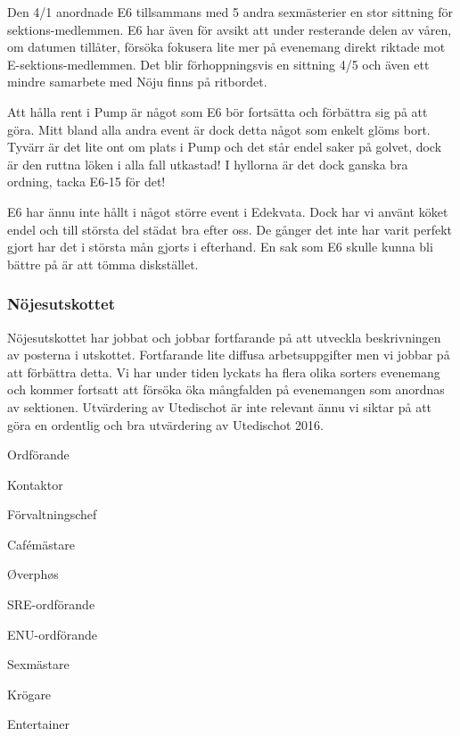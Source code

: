 \documentclass[../_main/handlingar.tex]{subfiles}
\begin{document}
Den 4/1 anordnade E6 tillsammans med 5 andra sexmästerier en stor sittning för sektions-medlemmen. E6 har även för avsikt att under resterande delen av våren, om datumen tillåter, försöka fokusera lite mer på evenemang direkt riktade mot E-sektions-medlemmen. Det blir förhoppningsvis en sittning 4/5 och även ett mindre samarbete med Nöju finns på ritbordet.

Att hålla rent i Pump är något som E6 bör fortsätta och förbättra sig på att göra. Mitt bland alla andra event är dock detta något som enkelt glöms bort. Tyvärr är det lite ont om plats i Pump och det står endel saker på golvet, dock är den ruttna löken i alla fall utkastad! I hyllorna är det dock ganska bra ordning, tacka E6-15 för det!

E6 har ännu inte hållt i något större event i Edekvata. Dock har vi använt köket endel och till största del städat bra efter oss. De gånger det inte har varit perfekt gjort har det i största mån gjorts i efterhand. En sak som E6 skulle kunna bli bättre på är att tömma diskstället.

\subsubsection*{Nöjesutskottet}
Nöjesutskottet har jobbat och jobbar fortfarande på att utveckla beskrivningen av posterna i utskottet. Fortfarande lite diffusa arbetsuppgifter men vi jobbar på att förbättra detta. Vi har under tiden lyckats ha flera olika sorters evenemang och kommer fortsatt att försöka öka mångfalden på evenemangen som anordnas av sektionen. Utvärdering av Utedischot är inte relevant ännu vi siktar på att göra en ordentlig och bra utvärdering av Utedischot 2016.

\newpage
\begin{signatures}{10}
    \mvh
    \signature{Fredrik Peterson}{Ordförande}
    \signature{Erik Månsson}{Kontaktor}
    \signature{Anders Nilsson}{Förvaltningschef}
    \signature{Stephanie Mirsky}{Cafémästare}
    \signature{Molly Rusk}{Øverphøs}
    \signature{Johan Persson}{SRE-ordförande}
    \signature{Johannes Koch}{ENU-ordförande}
    \signature{Martin Gemborn Nilsson}{Sexmästare}
    \signature{Malin Lindström}{Krögare}
    \signature{Dalia Khairallah}{Entertainer}
\end{signatures}
\end{document}
